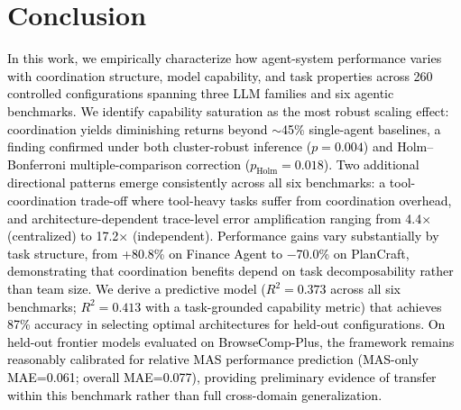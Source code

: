 \section{Conclusion}
\textcolor{black}{In this work, we empirically characterize how agent-system performance varies with coordination structure, model capability, and task properties across 260 controlled configurations spanning three LLM families and six agentic benchmarks. We identify capability saturation as the most robust scaling effect: coordination yields diminishing returns beyond $\sim$45\% single-agent baselines, a finding confirmed under both cluster-robust inference ($p=0.004$) and Holm--Bonferroni multiple-comparison correction ($p_{\text{Holm}}=0.018$). Two additional directional patterns emerge consistently across all six benchmarks: a tool-coordination trade-off where tool-heavy tasks suffer from coordination overhead, and architecture-dependent trace-level error amplification ranging from 4.4$\times$ (centralized) to 17.2$\times$ (independent). Performance gains vary substantially by task structure, from +80.8\% on Finance Agent to $-$70.0\% on PlanCraft, demonstrating that coordination benefits depend on task decomposability rather than team size. We derive a predictive model ($R^2{=}0.373$ across all six benchmarks; $R^2{=}0.413$ with a task-grounded capability metric) that achieves 87\% accuracy in selecting optimal architectures for held-out configurations. On held-out frontier models evaluated on BrowseComp-Plus, the framework remains reasonably calibrated for relative MAS performance prediction (MAS-only MAE=0.061; overall MAE=0.077), providing preliminary evidence of transfer within this benchmark rather than full cross-domain generalization.}